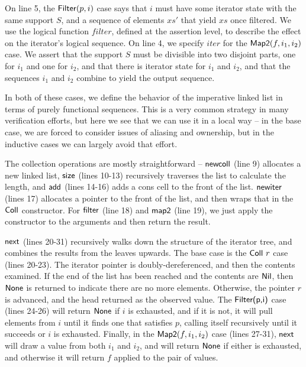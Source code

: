 \documentclass[preprint,natbib]{sigplanconf}
\begin{document}
On line 5, the $\mbox{\textsf{{Filter}}}(p,i)$ case says that $i$ must have some
iterator state with the same support $S$, and a sequence of elements
$xs'$ that yield $xs$ once filtered. We use the logical function
$filter$, defined at the assertion level, to describe the effect on
the iterator's logical sequence.  On line 4, we specify $iter$ for the
$\mbox{\textsf{{Map2}}}(f, i_1, i_2)$ case. We assert that the support $S$ must
be divisible into two disjoint parts, one for $i_1$ and one for $i_2$,
and that there is iterator state for $i_1$ and $i_2$, and that the
sequences $i_1$ and $i_2$ combine to yield the output sequence.

In both of these cases, we define the behavior of the imperative
linked list in terms of purely functional sequences. This is a very
common strategy in many verification efforts, but here we see that we
can use it in a local way -- in the base case, we are forced to
consider issues of aliasing and ownership, but in the inductive cases
we can largely avoid that effort.

The collection operations are mostly straightforward --
$\mbox{\textsf{{newcoll}}}$ (line 9) allocates a new linked list, $\mbox{\textsf{{size}}}$
(lines 10-13) recursively traverses the list to calculate the length,
and $\mbox{\textsf{{add}}}$ (lines 14-16) adds a cons cell to the front of the
list.  $\mbox{\textsf{{newiter}}}$ (lines 17) allocates a pointer to the front
of the list, and then wraps that in the $\mbox{\textsf{{Coll}}}$
constructor. For $\mbox{\textsf{{filter}}}$ (line 18) and $\mbox{\textsf{{map2}}}$ (line
19), we just apply the constructor to the arguments and then return
the result.

$\mbox{\textsf{{next}}}$ (lines 20-31) recursively walks down the structure of
the iterator tree, and combines the results from the leaves upwards.
The base case is the $\mbox{\textsf{{Coll }}}r$ case (lines 20-23). The iterator
pointer is doubly-dereferenced, and then the contents examined. If the
end of the list has been reached and the contents are $\mbox{\textsf{{Nil}}}$,
then $\mbox{\textsf{{None}}}$ is returned to indicate there are no more
elements. Otherwise, the pointer $r$ is advanced, and the head
returned as the observed value. The $\mbox{\textsf{{Filter(p,i)}}}$ case (lines
24-26) will return $\mbox{\textsf{{None}}}$ if $i$ is exhausted, and if it is
not, it will pull elements from $i$ until it finds one that satisfies
$p$, calling itself recursively until it succeeds or $i$ is exhausted.
Finally, in the $\mbox{\textsf{{Map2}}}(f, i_1, i_2)$ case (lines 27-31),
$\mbox{\textsf{{next}}}$ will draw a value from both $i_1$ and $i_2$, and will
return $\mbox{\textsf{{None}}}$ if either is exhausted, and otherwise it will
return $f$ applied to the pair of values.
\end{document}
